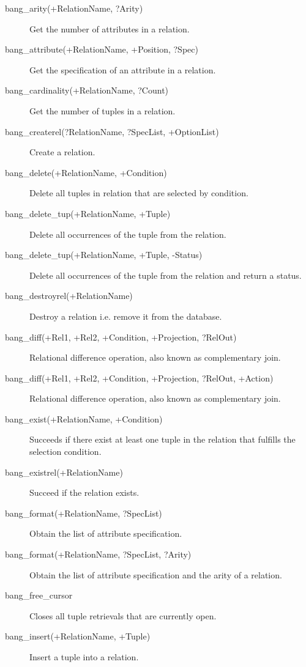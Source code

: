 \begin{description}
\item[bang_arity(+RelationName, ?Arity)]{Get the number of attributes in a relation.}
\item[bang_attribute(+RelationName, +Position, ?Spec)]{Get the specification of an attribute in a relation.}
\item[bang_cardinality(+RelationName, ?Count)]{Get the number of tuples in a relation.}
\item[bang_createrel(?RelationName, ?SpecList, +OptionList)]{Create a relation.}
\item[bang_delete(+RelationName, +Condition)]{Delete all tuples in relation that are selected by condition.}
\item[bang_delete_tup(+RelationName, +Tuple)]{Delete all occurrences of the tuple from the relation.}
\item[bang_delete_tup(+RelationName, +Tuple, -Status)]{Delete all occurrences of the tuple from the relation and return a status.}
\item[bang_destroyrel(+RelationName)]{Destroy a relation i.e. remove it from the database.}
\item[bang_diff(+Rel1, +Rel2, +Condition, +Projection, ?RelOut)]{Relational difference operation, also known as complementary join.}
\item[bang_diff(+Rel1, +Rel2, +Condition, +Projection, ?RelOut, +Action)]{Relational difference operation, also known as complementary join.}
\item[bang_exist(+RelationName, +Condition)]{Succeeds if there exist at least one tuple in the relation that fulfills the selection condition.}
\item[bang_existrel(+RelationName)]{Succeed if the relation exists.}
\item[bang_format(+RelationName, ?SpecList)]{Obtain the list of attribute specification.}
\item[bang_format(+RelationName, ?SpecList, ?Arity)]{Obtain the list of attribute specification and the arity of a relation.}
\item[bang_free_cursor]{Closes all tuple retrievals that are currently open.}
\item[bang_insert(+RelationName, +Tuple)]{Insert a tuple into a relation.}

\end{description}
